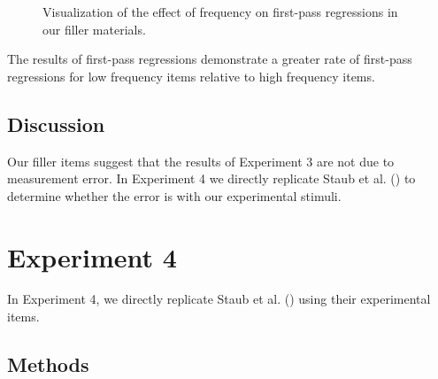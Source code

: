 \documentclass[
  letterpaper,
  DIV=11,
  numbers=noendperiod,
  nottoc]{scrreprt}
\begin{document}
\begin{figure}[htbp]


\caption{\label{fig-firstpassregressionfiller}Visualization of the
effect of frequency on first-pass regressions in our filler materials.}

\end{figure}%

The results of first-pass regressions demonstrate a greater rate of
first-pass regressions for low frequency items relative to high
frequency items.

\section{Discussion}\label{discussion}

Our filler items suggest that the results of Experiment 3 are not due to
measurement error. In Experiment 4 we directly replicate Staub et al.
() to determine
whether the error is with our experimental stimuli.


\chapter{Experiment 4}\label{experiment-4}

In Experiment 4, we directly replicate Staub et al.
() using their
experimental items.

\section{Methods}\label{methods-1}
\end{document}
